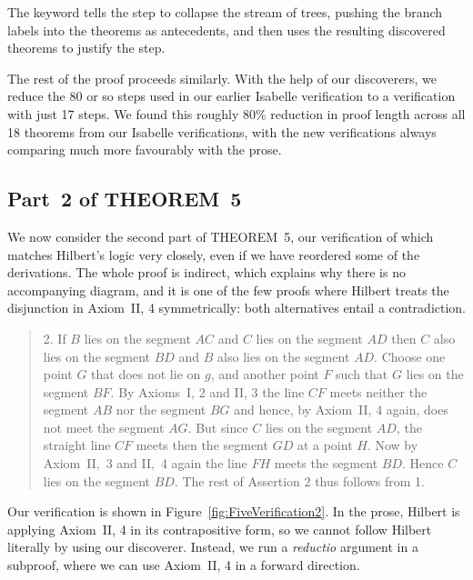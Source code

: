 \linebreak

The  keyword tells the step to collapse the stream of trees, pushing the branch labels into the theorems as antecedents, and then uses the resulting discovered theorems to justify the step.

The rest of the proof proceeds similarly. With the help of our discoverers, we reduce the 80 or so steps used in our earlier Isabelle verification to a verification with just 17 steps. We found this roughly 80\% reduction in proof length across all 18 theorems from our Isabelle verifications, with the new verifications always comparing much more favourably with the prose.

\subsection{Part~2 of THEOREM~5}
We now consider the second part of THEOREM~5, our verification of which matches Hilbert's logic very closely, even if we have reordered some of the derivations. The whole proof is indirect, which explains why there is no accompanying diagram, and it is one of the few proofs where Hilbert treats the disjunction in Axiom~II, 4 symmetrically: both alternatives entail a contradiction.

\begin{quote}2. If $B$ lies on the segment $AC$ and $C$ lies on the segment $AD$ then $C$ also lies on the segment $BD$ and $B$ also lies on the segment $AD$. Choose one point $G$ that does not lie on $g$, and another point $F$ such that $G$ lies on the segment $BF$. By Axioms~I, 2 and II, 3 the line $CF$ meets neither the segment $AB$ nor the segment $BG$ and hence, by Axiom~II, 4 again, does not meet the segment $AG$. But since $C$ lies on the segment $AD$, the straight line $CF$ meets then the segment $GD$ at a point $H$. Now by Axiom~II,~3 and II,~4 again the line $FH$ meets the segment $BD$. Hence $C$ lies on the segment $BD$. The rest of Assertion 2 thus follows from 1.
\end{quote}

Our verification is shown in Figure~\ref{fig:FiveVerification2}. In the prose, Hilbert is applying Axiom~II, 4 in its contrapositive form, so we cannot follow Hilbert literally by using our  discoverer. Instead, we run a \emph{reductio} argument in a subproof, where we can use Axiom~II, 4 in a forward direction.

